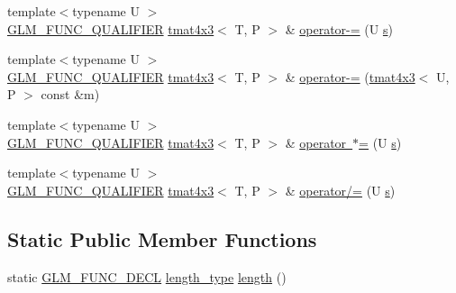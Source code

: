 \begin{DoxyCompactItemize}
\item 
{\footnotesize template$<$typename U $>$ }\\\mbox{\hyperlink{setup_8hpp_a33fdea6f91c5f834105f7415e2a64407}{G\+L\+M\+\_\+\+F\+U\+N\+C\+\_\+\+Q\+U\+A\+L\+I\+F\+I\+ER}} \mbox{\hyperlink{structglm_1_1tmat4x3}{tmat4x3}}$<$ T, P $>$ \& \mbox{\hyperlink{structglm_1_1tmat4x3_a07f1856eb5bd526ae5035b9506be5e31}{operator-\/=}} (U \mbox{\hyperlink{glad_8h_af1b1d5edfea6a34daee7389b1b5810ad}{s}})
\item 
{\footnotesize template$<$typename U $>$ }\\\mbox{\hyperlink{setup_8hpp_a33fdea6f91c5f834105f7415e2a64407}{G\+L\+M\+\_\+\+F\+U\+N\+C\+\_\+\+Q\+U\+A\+L\+I\+F\+I\+ER}} \mbox{\hyperlink{structglm_1_1tmat4x3}{tmat4x3}}$<$ T, P $>$ \& \mbox{\hyperlink{structglm_1_1tmat4x3_a8bfdcb72c5c392609d32e6cb9f312964}{operator-\/=}} (\mbox{\hyperlink{structglm_1_1tmat4x3}{tmat4x3}}$<$ U, P $>$ const \&m)
\item 
{\footnotesize template$<$typename U $>$ }\\\mbox{\hyperlink{setup_8hpp_a33fdea6f91c5f834105f7415e2a64407}{G\+L\+M\+\_\+\+F\+U\+N\+C\+\_\+\+Q\+U\+A\+L\+I\+F\+I\+ER}} \mbox{\hyperlink{structglm_1_1tmat4x3}{tmat4x3}}$<$ T, P $>$ \& \mbox{\hyperlink{structglm_1_1tmat4x3_a3370613ad66cda25a33a919fd7f53124}{operator $\ast$=}} (U \mbox{\hyperlink{glad_8h_af1b1d5edfea6a34daee7389b1b5810ad}{s}})
\item 
{\footnotesize template$<$typename U $>$ }\\\mbox{\hyperlink{setup_8hpp_a33fdea6f91c5f834105f7415e2a64407}{G\+L\+M\+\_\+\+F\+U\+N\+C\+\_\+\+Q\+U\+A\+L\+I\+F\+I\+ER}} \mbox{\hyperlink{structglm_1_1tmat4x3}{tmat4x3}}$<$ T, P $>$ \& \mbox{\hyperlink{structglm_1_1tmat4x3_ab1383b67bc01f049a43804b2253384b9}{operator/=}} (U \mbox{\hyperlink{glad_8h_af1b1d5edfea6a34daee7389b1b5810ad}{s}})
\end{DoxyCompactItemize}
\subsection*{Static Public Member Functions}
\begin{DoxyCompactItemize}
\item 
static \mbox{\hyperlink{setup_8hpp_ab2d052de21a70539923e9bcbf6e83a51}{G\+L\+M\+\_\+\+F\+U\+N\+C\+\_\+\+D\+E\+CL}} \mbox{\hyperlink{structglm_1_1tmat4x3_a2f1ac502cc552a921a905e8a858fb1d7}{length\+\_\+type}} \mbox{\hyperlink{structglm_1_1tmat4x3_aba1f214b7f592a7006c5c53df07e6081}{length}} ()
\end{DoxyCompactItemize}


